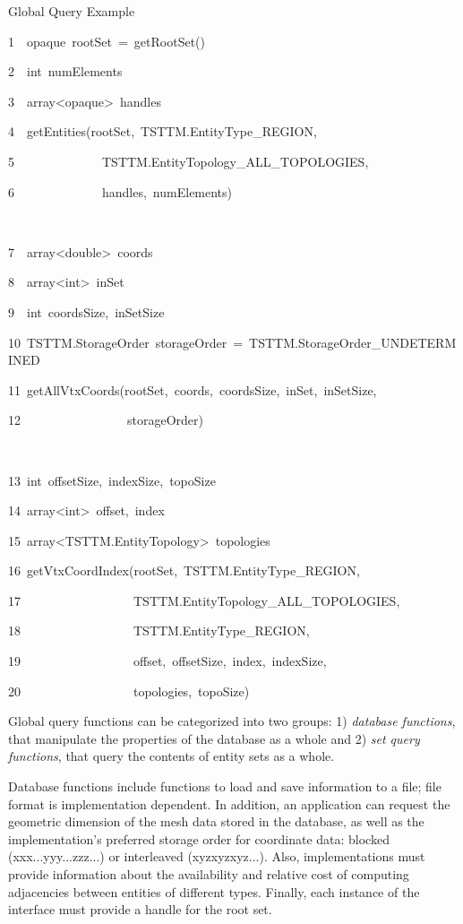 \begin{algorithm*}

\caption{Global Query Example\label{alg:Global-Mesh-Query}}
\begin{lyxcode}
1~~opaque~rootSet~=~getRootSet()

2~~int~numElements

3~~array<opaque>~handles

4~~getEntities(rootSet,~TSTTM.EntityType\_REGION,

5~~~~~~~~~~~~~~TSTTM.EntityTopology\_ALL\_TOPOLOGIES,

6~~~~~~~~~~~~~~handles,~numElements)

~

7~~array<double>~coords

8~~array<int>~inSet

9~~int~coordsSize,~inSetSize

10~TSTTM.StorageOrder~storageOrder~=~TSTTM.StorageOrder\_UNDETERMINED

11~getAllVtxCoords(rootSet,~coords,~coordsSize,~inSet,~inSetSize,~

12~~~~~~~~~~~~~~~~~storageOrder)

~

13~int~offsetSize,~indexSize,~topoSize

14~array<int>~offset,~index

15~array<TSTTM.EntityTopology>~topologies

16~getVtxCoordIndex(rootSet,~TSTTM.EntityType\_REGION,

17~~~~~~~~~~~~~~~~~~TSTTM.EntityTopology\_ALL\_TOPOLOGIES,

18~~~~~~~~~~~~~~~~~~TSTTM.EntityType\_REGION,

19~~~~~~~~~~~~~~~~~~offset,~offsetSize,~index,~indexSize,

20~~~~~~~~~~~~~~~~~~topologies,~topoSize)
\end{lyxcode}

\end{algorithm*}


Global query functions can be categorized into two groups: 1)
\emph{database functions}, that manipulate the properties of the
database as a whole and 2) \emph{set query functions}, that query the
contents of entity sets as a whole.  

Database functions include functions to load and save information to a
file; file format is implementation dependent. In addition, an
application can request the geometric dimension of the mesh data stored
in the database, as well as the implementation's preferred storage order
for coordinate data: blocked (xxx...yyy...zzz...) or interleaved
(xyzxyzxyz...).  Also, implementations must provide information about
the availability and relative cost of computing adjacencies between
entities of different types. Finally, each instance of the interface
must provide a handle for the root set.

